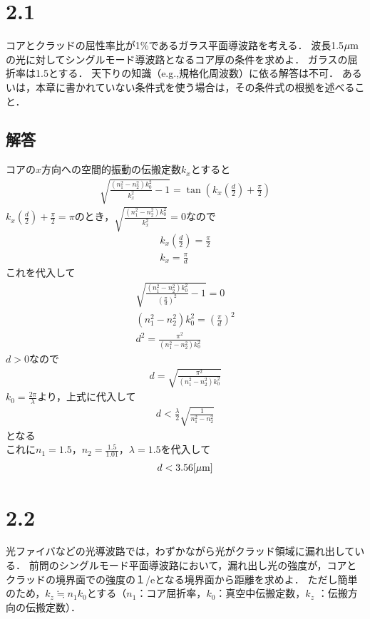 \section*{2.1}
コアとクラッドの屈性率比が1\%であるガラス平面導波路を考える．
波長1.5${\rm \mu m}$の光に対してシングルモード導波路となるコア厚の条件を求めよ．
ガラスの屈折率は1.5とする．
天下りの知識（e.g.,規格化周波数）に依る解答は不可．
あるいは，本章に書かれていない条件式を使う場合は，その条件式の根拠を述べること．

\subsection*{解答}
\noindent
コアの$x$方向への空間的振動の伝搬定数$k_x$とすると
\begin{eqnarray*}
    \sqrt{\frac{(n_1^2-n_2^2)k_0^2}{k_x^2}-1}=\tan\left(k_x\left(\frac{d}{2}\right)+\frac{\pi}{2}\right)
\end{eqnarray*}
$k_x\left(\frac{d}{2}\right)+\frac{\pi}{2}=\pi$のとき，$\sqrt{\frac{(n_1^2-n_2^2)k_0^2}{k_x^2}}=0$なので
\begin{eqnarray*}
    k_x\left(\frac{d}{2}\right)=\frac{\pi}{2}\\
    k_x=\frac{\pi}{d}
\end{eqnarray*}
これを代入して
\begin{eqnarray*}
    \sqrt{\frac{(n_1^2-n_2^2)k_0^2}{\left(\frac{\pi}{d}\right)^2}-1}=0\\
    (n_1^2-n_2^2)k_0^2=\left(\frac{\pi}{d}\right)^2\\
    d^2=\frac{\pi^2}{(n_1^2-n_2^2)k_0^2}
\end{eqnarray*}
$d>0$なので
\begin{eqnarray*}
    d=\sqrt{\frac{\pi^2}{(n_1^2-n_2^2)k_0^2}}
\end{eqnarray*}
$k_0=\frac{2\pi}{\lambda}$より，上式に代入して
\begin{eqnarray*}
    d<\frac{\lambda}{2}\sqrt{\frac{1}{n_1^2-n_2^2}}
\end{eqnarray*}
となる\\
これに$n_1=1.5$，$n_2=\frac{1.5}{1.01}$，$\lambda=1.5$を代入して
\begin{eqnarray*}
    d<3.56[{\rm \mu m}]
\end{eqnarray*}

\section*{2.2}
光ファイバなどの光導波路では，わずかながら光がクラッド領域に漏れ出している．
前問のシングルモード平面導波路において，漏れ出し光の強度が，コアとクラッドの境界面での強度の１/eとなる境界面から距離を求めよ．
ただし簡単のため，$k_z \fallingdotseq n_1k_0$とする（$n_1$：コア屈折率，$k_0$：真空中伝搬定数，$k_z$ ：伝搬方向の伝搬定数）．

